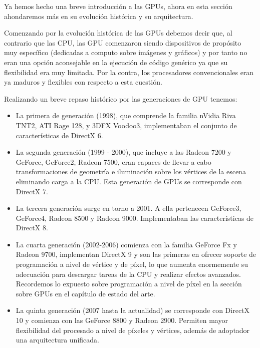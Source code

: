 Ya hemos hecho una breve introducción a las GPUs, ahora en esta sección ahondaremos más en su evolución histórica y su arquitectura.

Comenzando por la evolución histórica de las GPUs debemos decir que, al contrario que las CPU, las GPU comenzaron siendo dispositivos de propósito muy específico (dedicadas a computo sobre imágenes y gráficos) y por tanto no eran una opción aconsejable en la ejecución de código genérico ya que su flexibilidad era muy limitada.  Por la contra, los procesadores convencionales eran ya maduros y flexibles con respecto a esta cuestión.

Realizando un breve repaso histórico por las generaciones de GPU tenemos:

\begin{itemize}

\item La primera de generación (1998), que comprende la familia nVidia Riva TNT2, ATI Rage 128, y 3DFX Voodoo3, implementaban el conjunto de características de DirectX 6. 

\item La segunda generación (1999 - 2000), que incluye a las Radeon 7200 y GeForce, GeForce2, Radeon 7500, eran capaces de llevar a cabo transformaciones de geometría e iluminación sobre los vértices de la escena eliminando carga a la CPU. Esta generación de GPUs se corresponde con DirectX 7.

\item La tercera generación surge en torno a 2001. A ella pertenecen GeForce3, GeForce4, Radeon 8500 y Radeon 9000. Implementaban las  características de DirectX 8.

\item La cuarta generación (2002-2006) comienza con la familia GeForce Fx y
Radeon 9700, implementan DirectX 9 y son las primeras en ofrecer soporte de programación a nivel de vértice y de píxel, lo que aumenta
enormemente su adecuación para descargar tareas de la CPU y realizar efectos avanzados. Recordemos lo expuesto sobre programación a nivel de píxel en la sección sobre GPUs en el capítulo de estado del arte.


\item La quinta generación (2007 hasta la actualidad) se corresponde con DirectX 10 y comienza con las GeForce 8800 y Radeon 2900. Permiten mayor flexibilidad del procesado a nivel de píxeles y vértices, además de adoptador una arquitectura unificada.


\end{itemize}


